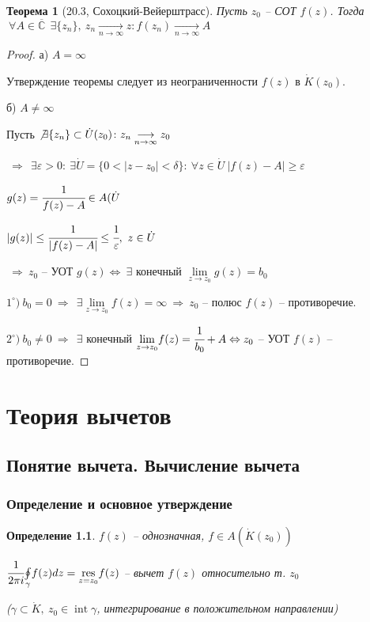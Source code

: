 \documentclass[draft]{report}
\newcommand{\res}{\mathop{\mathrm{res}}\nolimits}
\newcommand{\then}{\ \Rightarrow\ }
\renewcommand{\C}{\mathbb{C}}
\newcommand{\moint}[1]{\underset{#1}{\oint}}
\newcommand{\mlim}[1]{\underset{#1}{\lim}}
\newcommand{\mres}[1]{\underset{#1}{\res}}
\newcommand{\LRA}{\Leftrightarrow}
\renewcommand{\bar}{\overline}
\newcommand{\Int}{\mathop{\mathrm{int}}\nolimits}
\newcommand{\g}{\gamma}
\newcommand{\e}{\varepsilon}
\newcommand{\E}{\ \exists}
\newcommand{\F}{\ \forall}
\newcommand{\CC}{\bar{\C}}
\newcommand{\opr}[1]{\begin{opred}#1\end{opred}}
\newcommand{\lra}[1]{\underset{#1}{\longrightarrow}}
\newtheorem*{theor}{Теорема}
\newtheorem*{opred}{Определение}
\theoremstyle{remark}
\begin{document}
\begin{theor}[20.3, Сохоцкий-Вейерштрасс]
Пусть $z_0$ -- СОТ $f(z)$. Тогда $\F A\in\CC\ \E\{z_n\},\ z_n\lra{n\to\infty}z\colon f(z_n)\lra{n\to\infty}A$
\end{theor}
\begin{proof}
а) $A=\infty$

Утверждение теоремы следует из неограниченности $f(z)$ в $\dot{K}(z_0)$.

б) $A\neq\infty$

Пусть $\not\exists\{z_n\}\subset \dot{U}(z_0)\colon z_n\lra{n\to\infty}z_0$

$\then \E \e>0\colon\E \dot{U}=\{0<|z-z_0|<\delta\}\colon\F z\in \dot{U}\ |f(z)-A|\geq \e$

$g(z)=\cfrac1{f(z)-A}\in A(\dot{U}$

$|g(z)|\leq\cfrac1{|f(z)-A|}\leq\cfrac1\e,\ z\in\dot{U}$

$\then z_0$ -- УОТ $g(z) \LRA \E$ конечный $\mlim{z\to z_0}g(z)=b_0$

$1^\circ)\ b_0=0\then \E\mlim{z\to z_0}f(z)=\infty\then z_0$ -- полюс $f(z)$ -- противоречие.

$2^\circ)\ b_0\neq0\then\E$ конечный $\mlim{z\to z_0}f(z)=\cfrac1{b_0}+A \LRA z_0$ -- УОТ $f(z)$ -- противоречие.
\end{proof}

\chapter{Теория вычетов}

\section{Понятие вычета. Вычисление вычета}

\subsection{Определение и основное утверждение}

\opr{$f(z)$ -- однозначная, $f\in A(\dot{K}(z_0))$

$\cfrac1{2\pi i}\moint{\g}f(z)dz=\mres{z=z_0}f(z)$ -- вычет $f(z)$ относительно т. $z_0$

($\g\subset\dot{K},\ z_0\in\Int\g$, интегрирование в положительном направлении)}
\end{document}
